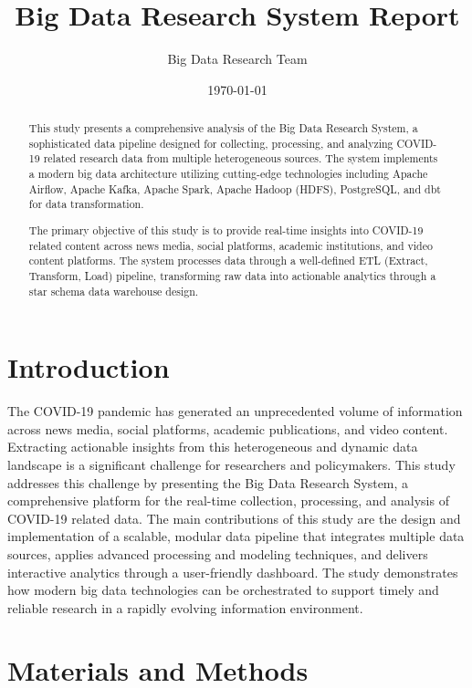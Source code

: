 \documentclass[a4paper]{article}
\title{Big Data Research System Report}
\author{Big Data Research Team}
\date{\today}
\theoremstyle{plain}
\theoremstyle{definition}
\begin{document}
\maketitle

\begin{abstract}
This study presents a comprehensive analysis of the Big Data Research System, a sophisticated data pipeline designed for collecting, processing, and analyzing COVID-19 related research data from multiple heterogeneous sources. The system implements a modern big data architecture utilizing cutting-edge technologies including Apache Airflow, Apache Kafka, Apache Spark, Apache Hadoop (HDFS), PostgreSQL, and dbt for data transformation.

The primary objective of this study is to provide real-time insights into COVID-19 related content across news media, social platforms, academic institutions, and video content platforms. The system processes data through a well-defined ETL (Extract, Transform, Load) pipeline, transforming raw data into actionable analytics through a star schema data warehouse design.
\end{abstract}


\section{Introduction}

The COVID-19 pandemic has generated an unprecedented volume of information across news media, social platforms, academic publications, and video content. Extracting actionable insights from this heterogeneous and dynamic data landscape is a significant challenge for researchers and policymakers. This study addresses this challenge by presenting the Big Data Research System, a comprehensive platform for the real-time collection, processing, and analysis of COVID-19 related data. The main contributions of this study are the design and implementation of a scalable, modular data pipeline that integrates multiple data sources, applies advanced processing and modeling techniques, and delivers interactive analytics through a user-friendly dashboard. The study demonstrates how modern big data technologies can be orchestrated to support timely and reliable research in a rapidly evolving information environment.

\section{Materials and Methods}
\end{document}
